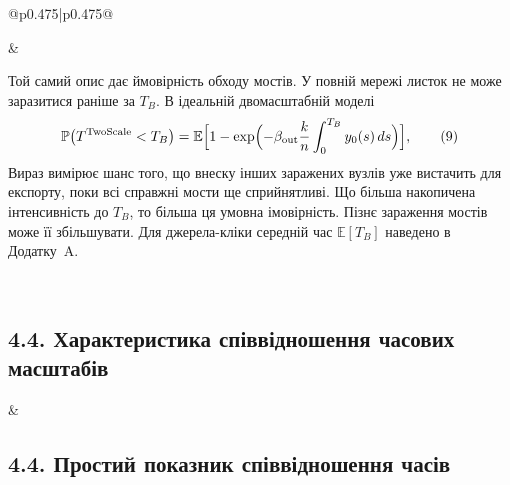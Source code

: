 \documentclass[11pt]{article}
\newcommand{\TS}{\textnormal{TwoScale}}
\begin{document}
\begin{longtable}{@{}p{0.475\textwidth}|p{0.475\textwidth}@{}}
\begin{minipage}[t]{\linewidth}
\end{minipage} &
\begin{minipage}[t]{\linewidth}
Той самий опис дає ймовірність обходу мостів. У повній мережі листок не може заразитися раніше за $T_B$. В ідеальній двомасштабній моделі
\begin{equation*}\mathbb{P}\bigl(T^{\TS}<T_B\bigr)=\mathbb{E}\Bigl[1-\exp\Bigl(-\beta_{\mathrm{out}}\frac{k}{n}\int_0^{T_B}y_0(s)\,ds\Bigr)\Bigr],\tag{9}
\end{equation*}
Вираз вимірює шанс того, що внеску інших заражених вузлів уже вистачить для експорту, поки всі справжні мости ще сприйнятливі. Що більша накопичена інтенсивність до $T_B$, то більша ця умовна імовірність. Пізнє зараження мостів може її збільшувати. Для джерела-кліки середній час $\mathbb{E}[T_B]$ наведено в Додатку~A.
\end{minipage} \\[5mm]
\begin{minipage}[t]{\linewidth}
\subsection*{4.4. Характеристика співвідношення часових масштабів}

\end{minipage} &
\begin{minipage}[t]{\linewidth}
\subsection*{4.4. Простий показник співвідношення часів}


\end{minipage}
\end{longtable}
\end{document}
